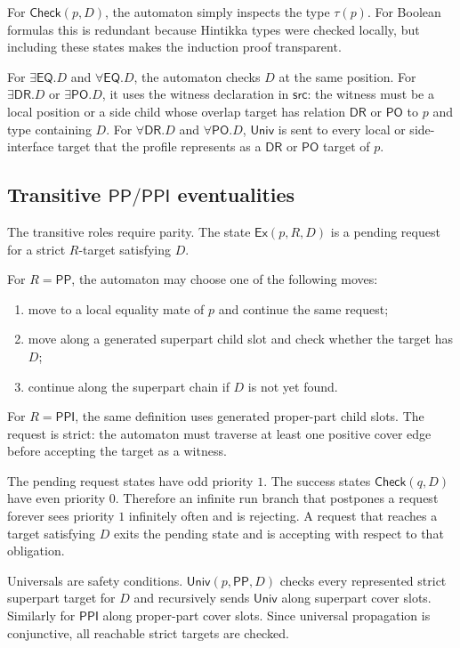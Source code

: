 \documentclass[11pt]{article}
\newcommand{\EQ}{\mathsf{EQ}}
\newcommand{\PP}{\mathsf{PP}}
\newcommand{\PPI}{\mathsf{PPI}}
\newcommand{\PO}{\mathsf{PO}}
\newcommand{\DR}{\mathsf{DR}}
\begin{document}
For $\mathsf{Check}(p,D)$, the automaton simply inspects the type $\tau(p)$.  For Boolean formulas this is redundant because Hintikka types were checked locally, but including these states makes the induction proof transparent.

For $\exists\EQ.D$ and $\forall\EQ.D$, the automaton checks $D$ at the same position.  For $\exists\DR.D$ or $\exists\PO.D$, it uses the witness declaration in $\mathsf{src}$: the witness must be a local position or a side child whose overlap target has relation $\DR$ or $\PO$ to $p$ and type containing $D$.  For $\forall\DR.D$ and $\forall\PO.D$, $\mathsf{Univ}$ is sent to every local or side-interface target that the profile represents as a $\DR$ or $\PO$ target of $p$.

\subsection{Transitive $\PP/\PPI$ eventualities}

The transitive roles require parity.  The state $\mathsf{Ex}(p,R,D)$ is a pending request for a strict $R$-target satisfying $D$.

For $R=\PP$, the automaton may choose one of the following moves:
\begin{enumerate}[label=(P\arabic*)]
\item move to a local equality mate of $p$ and continue the same request;
\item move along a generated superpart child slot and check whether the target has $D$;
\item continue along the superpart chain if $D$ is not yet found.
\end{enumerate}
For $R=\PPI$, the same definition uses generated proper-part child slots.  The request is strict: the automaton must traverse at least one positive cover edge before accepting the target as a witness.

The pending request states have odd priority $1$.  The success states $\mathsf{Check}(q,D)$ have even priority $0$.  Therefore an infinite run branch that postpones a request forever sees priority $1$ infinitely often and is rejecting.  A request that reaches a target satisfying $D$ exits the pending state and is accepting with respect to that obligation.

Universals are safety conditions.  $\mathsf{Univ}(p,\PP,D)$ checks every represented strict superpart target for $D$ and recursively sends $\mathsf{Univ}$ along superpart cover slots.  Similarly for $\PPI$ along proper-part cover slots.  Since universal propagation is conjunctive, all reachable strict targets are checked.
\end{document}
